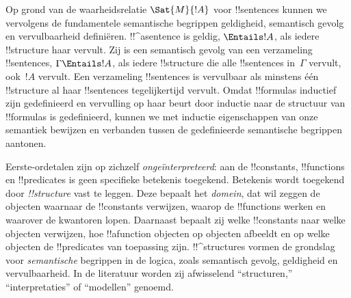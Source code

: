 \documentclass[openany]{memoir}
\begin{document}
Op grond van de waarheidsrelatie $\Sat{M}{!A}$ voor !!{sentence}s
kunnen we vervolgens de fundamentele semantische begrippen geldigheid,
semantisch gevolg en vervulbaarheid definiëren. !!^a{sentence} is
geldig, $\Entails !A$, als iedere !!{structure} haar vervult. Zij is
een semantisch gevolg van een verzameling !!{sentence}s,
$\Gamma \Entails !A$, als iedere !!{structure} die alle !!{sentence}s
in~$\Gamma$ vervult, ook~$!A$ vervult. Een verzameling !!{sentence}s is
vervulbaar als minstens één !!{structure} al haar !!{sentence}s
tegelijkertijd vervult. Omdat !!{formula}s inductief zijn gedefinieerd
en vervulling op haar beurt door inductie naar de structuur van
!!{formula}s is gedefinieerd, kunnen we met inductie eigenschappen van
onze semantiek bewijzen en verbanden tussen de gedefinieerde
semantische begrippen aantonen.
\endgroup

\begingroup
\def\olfilename{OLP-0161}
\def\olfilepath{content/first-order-logic/syntax-and-semantics/}
\hypertarget{unit-OLP-0161}{}





\begin{explain}
Eerste-ordetalen zijn op zichzelf \emph{ongeïnterpreteerd}: aan de
!!{constant}s, !!{function}s en !!{predicate}s is geen specifieke
betekenis toegekend. Betekenis wordt toegekend door
 \emph{!!{structure}} vast te leggen. Deze bepaalt
het \emph{domein}, dat wil zeggen de objecten waarnaar de !!{constant}s
verwijzen, waarop de !!{function}s werken en waarover de kwantoren
lopen. Daarnaast bepaalt zij welke !!{constant}s naar welke objecten
verwijzen, hoe !!a{function} objecten op objecten afbeeldt en op welke
objecten de !!{predicate}s van toepassing zijn. !!^{structure}s vormen
de grondslag voor \emph{semantische} begrippen in de logica, zoals
semantisch gevolg, geldigheid en vervulbaarheid. In de literatuur
worden zij afwisselend ``structuren,'' ``interpretaties'' of
``modellen'' genoemd.
\end{explain}
\end{document}
